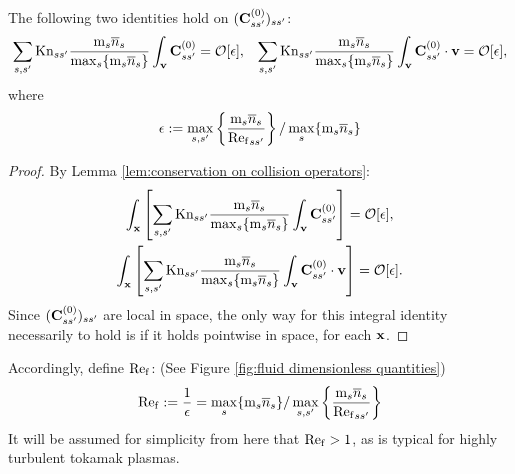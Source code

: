    \begin{lemma}\label{lem:conservation on local collision operators}
        The following two identities hold on $(\mathbf{C}_{ss'}^{(0)})_{ss'}$:
        \begin{align}
            \sum_{s, s'}\mathrm{Kn}_{ss'}\frac{\mathrm{m}_{s}\overline{n}_{s}}{\max_{s}\{\mathrm{m}_{s}\overline{n}_{s}\}}\int_{\mathbf{v}}\mathbf{C}_{ss'}^{(0)}  =  \mathcal{O}[\epsilon],  &&
            \sum_{s, s'}\mathrm{Kn}_{ss'}\frac{\mathrm{m}_{s}\overline{n}_{s}}{\max_{s}\{\mathrm{m}_{s}\overline{n}_{s}\}}\int_{\mathbf{v}}\mathbf{C}_{ss'}^{(0)}\cdot\mathbf{v}  =  \mathcal{O}[\epsilon],
        \end{align}
        where
        \begin{equation}
            \epsilon  :=  \max_{s, s'}\left\{\frac{\mathrm{m}_{s}\overline{n}_{s}}{{\mathrm{Re}_{\mathrm{f}}}_{ss'}}\right\}/\max_{s}\{\mathrm{m}_{s}\overline{n}_{s}\}
        \end{equation}
    \end{lemma}
    \begin{proof}
        By Lemma \ref{lem:conservation on collision operators}:
        \begin{multline}
            \int_{\mathbf{x}}\left[\sum_{s, s'}\mathrm{Kn}_{ss'}\frac{\mathrm{m}_{s}\overline{n}_{s}}{\max_{s}\{\mathrm{m}_{s}\overline{n}_{s}\}}\int_{\mathbf{v}}\mathbf{C}_{ss'}^{(0)}\right]  =  \mathcal{O}[\epsilon],  \\
            \int_{\mathbf{x}}\left[\sum_{s, s'}\mathrm{Kn}_{ss'}\frac{\mathrm{m}_{s}\overline{n}_{s}}{\max_{s}\{\mathrm{m}_{s}\overline{n}_{s}\}}\int_{\mathbf{v}}\mathbf{C}_{ss'}^{(0)}\cdot\mathbf{v}\right]  =  \mathcal{O}[\epsilon].
        \end{multline}
        Since $(\mathbf{C}_{ss'}^{(0)})_{ss'}$ are local in space, the only way for this integral identity necessarily to hold is if it holds pointwise in space, for each $\mathbf{x}$.
    \end{proof}

    Accordingly, define $\mathrm{Re}_{\mathrm{f}}$: (See Figure \ref{fig:fluid dimensionless quantities})
    \begin{equation}
        \mathrm{Re}_{\mathrm{f}}  :=  \frac{1}{\epsilon}  =  \max_{s}\{\mathrm{m}_{s}\overline{n}_{s}\}/\max_{s, s'}\left\{\frac{\mathrm{m}_{s}\overline{n}_{s}}{{\mathrm{Re}_{\mathrm{f}}}_{ss'}}\right\}
    \end{equation}
    It will be assumed for simplicity from here that $\mathrm{Re}_{\mathrm{f}} > 1$, as is typical for highly turbulent tokamak plasmas.

